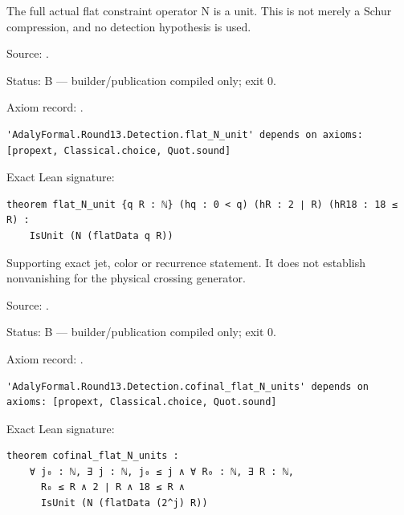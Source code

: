 \begin{theorem}[bp-502]
\label{bp-502}
\uses{}
\leanok
The full actual flat constraint operator N is a unit. This is not merely a Schur compression, and no detection hypothesis is used.

\par Source: \texttt{}.
\par Status: B — builder/publication compiled only; exit 0.
\par Axiom record: \texttt{}.
\begin{verbatim}
'AdalyFormal.Round13.Detection.flat_N_unit' depends on axioms: [propext, Classical.choice, Quot.sound]
\end{verbatim}
\par Exact Lean signature:
\begin{verbatim}
theorem flat_N_unit {q R : ℕ} (hq : 0 < q) (hR : 2 ∣ R) (hR18 : 18 ≤ R) :
    IsUnit (N (flatData q R))
\end{verbatim}
\end{theorem}

\begin{theorem}[bp-503]
\label{bp-503}
\leanok
Supporting exact jet, color or recurrence statement. It does not establish nonvanishing for the physical crossing generator.

\par Source: \texttt{}.
\par Status: B — builder/publication compiled only; exit 0.
\par Axiom record: \texttt{}.
\begin{verbatim}
'AdalyFormal.Round13.Detection.cofinal_flat_N_units' depends on axioms: [propext, Classical.choice, Quot.sound]
\end{verbatim}
\par Exact Lean signature:
\begin{verbatim}
theorem cofinal_flat_N_units :
    ∀ j₀ : ℕ, ∃ j : ℕ, j₀ ≤ j ∧ ∀ R₀ : ℕ, ∃ R : ℕ,
      R₀ ≤ R ∧ 2 ∣ R ∧ 18 ≤ R ∧
      IsUnit (N (flatData (2^j) R))
\end{verbatim}
\end{theorem}

